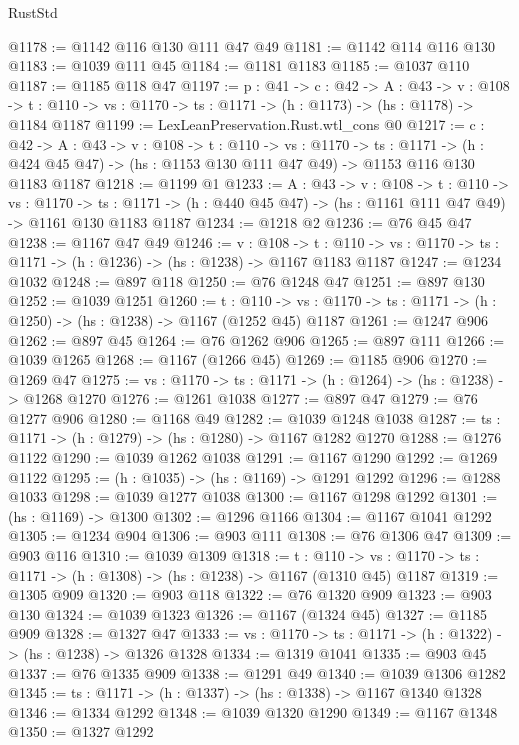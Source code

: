 \begin{lexlean}{RustStd}
\begin{coremodule}
{\begin{coremodule}
@1178 := @1142 @116 @130 @111 @47 @49
@1181 := @1142 @114 @116 @130
@1183 := @1039 @111 @45
@1184 := @1181 @1183
@1185 := @1037 @110
@1187 := @1185 @118 @47
@1197 := {p : @41} ->
  {c : @42} ->
  {A : @43} ->
  {v : @108} ->
  {t : @110} -> {vs : @1170} -> {ts : @1171} -> (h : @1173) -> (hs : @1178) -> @1184 @1187
@1199 := LexLeanPreservation.Rust.wtl_cons @0
@1217 := {c : @42} ->
  {A : @43} ->
  {v : @108} ->
  {t : @110} ->
  {vs : @1170} ->
  {ts : @1171} ->
  (h : @424 @45 @47) -> (hs : @1153 @130 @111 @47 @49) -> @1153 @116 @130 @1183 @1187
@1218 := @1199 @1
@1233 := {A : @43} ->
  {v : @108} ->
  {t : @110} ->
  {vs : @1170} ->
  {ts : @1171} -> (h : @440 @45 @47) -> (hs : @1161 @111 @47 @49) -> @1161 @130 @1183 @1187
@1234 := @1218 @2
@1236 := @76 @45 @47
@1238 := @1167 @47 @49
@1246 := {v : @108} ->
  {t : @110} -> {vs : @1170} -> {ts : @1171} -> (h : @1236) -> (hs : @1238) -> @1167 @1183 @1187
@1247 := @1234 @1032
@1248 := @897 @118
@1250 := @76 @1248 @47
@1251 := @897 @130
@1252 := @1039 @1251
@1260 := {t : @110} ->
  {vs : @1170} -> {ts : @1171} -> (h : @1250) -> (hs : @1238) -> @1167 (@1252 @45) @1187
@1261 := @1247 @906
@1262 := @897 @45
@1264 := @76 @1262 @906
@1265 := @897 @111
@1266 := @1039 @1265
@1268 := @1167 (@1266 @45)
@1269 := @1185 @906
@1270 := @1269 @47
@1275 := {vs : @1170} -> {ts : @1171} -> (h : @1264) -> (hs : @1238) -> @1268 @1270
@1276 := @1261 @1038
@1277 := @897 @47
@1279 := @76 @1277 @906
@1280 := @1168 @49
@1282 := @1039 @1248 @1038
@1287 := {ts : @1171} -> (h : @1279) -> (hs : @1280) -> @1167 @1282 @1270
@1288 := @1276 @1122
@1290 := @1039 @1262 @1038
@1291 := @1167 @1290
@1292 := @1269 @1122
@1295 := (h : @1035) -> (hs : @1169) -> @1291 @1292
@1296 := @1288 @1033
@1298 := @1039 @1277 @1038
@1300 := @1167 @1298 @1292
@1301 := (hs : @1169) -> @1300
@1302 := @1296 @1166
@1304 := @1167 @1041 @1292
@1305 := @1234 @904
@1306 := @903 @111
@1308 := @76 @1306 @47
@1309 := @903 @116
@1310 := @1039 @1309
@1318 := {t : @110} ->
  {vs : @1170} -> {ts : @1171} -> (h : @1308) -> (hs : @1238) -> @1167 (@1310 @45) @1187
@1319 := @1305 @909
@1320 := @903 @118
@1322 := @76 @1320 @909
@1323 := @903 @130
@1324 := @1039 @1323
@1326 := @1167 (@1324 @45)
@1327 := @1185 @909
@1328 := @1327 @47
@1333 := {vs : @1170} -> {ts : @1171} -> (h : @1322) -> (hs : @1238) -> @1326 @1328
@1334 := @1319 @1041
@1335 := @903 @45
@1337 := @76 @1335 @909
@1338 := @1291 @49
@1340 := @1039 @1306 @1282
@1345 := {ts : @1171} -> (h : @1337) -> (hs : @1338) -> @1167 @1340 @1328
@1346 := @1334 @1292
@1348 := @1039 @1320 @1290
@1349 := @1167 @1348
@1350 := @1327 @1292

\end{coremodule}}
\end{coremodule}
\end{lexlean}
